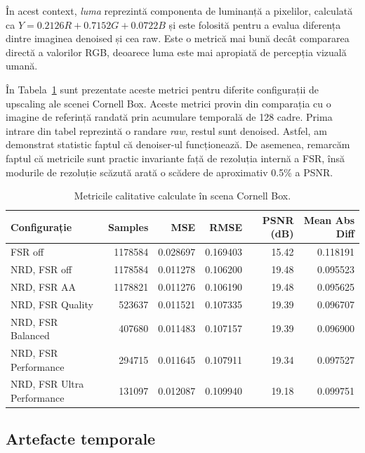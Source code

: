 \documentclass[12pt,a4paper]{report}
\numberwithin{equation}{section} %
\begin{document}
În acest context, \textit{luma} reprezintă componenta de luminanță a pixelilor, calculată ca $Y = 0.2126 R + 0.7152 G + 0.0722 B$ și este folosită pentru a evalua diferența dintre imaginea denoised și cea raw.
Este o metrică mai bună decât compararea directă a valorilor RGB, deoarece luma este mai apropiată de percepția vizuală umană.

În Tabela~\ref{tab:qual_nrd_metrics} sunt prezentate aceste metrici pentru diferite configurații de upscaling ale scenei Cornell Box.
Aceste metrici provin din comparația cu o imagine de referință randată prin acumulare temporală de 128 cadre.
Prima intrare din tabel reprezintă o randare \textit{raw}, restul sunt denoised.
Astfel, am demonstrat statistic faptul că denoiser-ul funcționează.
De asemenea, remarcăm faptul că metricile sunt practic invariante față de rezoluția internă a FSR, însă modurile de rezoluție scăzută arată o scădere de aproximativ 0.5\% a PSNR.

\begin{table}[htb]
    \centering
    \small
    \begin{tabular}{lrrrrr}
        \hline
        Configurație & Samples & MSE & RMSE & PSNR (dB) & Mean Abs Diff \\
        \hline
        FSR off & 1178584 & 0.028697 & 0.169403 & 15.42 & 0.118191 \\
        NRD, FSR off & 1178584 & 0.011278 & 0.106200 & 19.48 & 0.095523 \\
        NRD, FSR AA & 1178821 & 0.011276 & 0.106190 & 19.48 & 0.095625 \\
        NRD, FSR Quality & 523637 & 0.011521 & 0.107335 & 19.39 & 0.096707 \\
        NRD, FSR Balanced & 407680 & 0.011483 & 0.107157 & 19.39 & 0.096900 \\
        NRD, FSR Performance & 294715 & 0.011645 & 0.107911 & 19.34 & 0.097527 \\
        NRD, FSR Ultra Performance & 131097 & 0.012087 & 0.109940 & 19.18 & 0.099751 \\
        \hline
    \end{tabular}
    \caption{Metricile calitative calculate în scena Cornell Box.}
    \label{tab:qual_nrd_metrics}
\end{table}

\subsection{Artefacte temporale}
\end{document}
